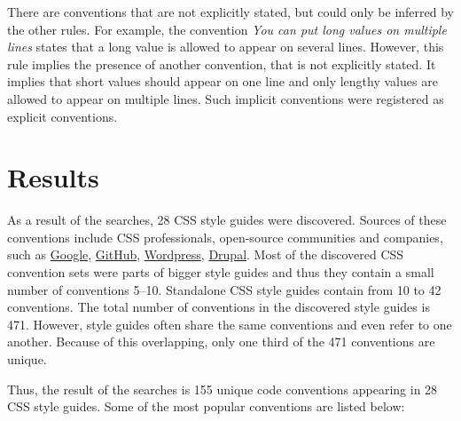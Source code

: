 There are conventions that are not explicitly stated, but could only be
inferred by the other rules. For example, the convention \textit{You can put
long values on multiple lines} states that a long value is allowed to appear
on several lines. However, this rule implies the presence of another
convention, that is not explicitly stated. It implies that short values should
appear on one line and only lengthy values are allowed to appear on multiple lines.
Such implicit conventions were registered as explicit conventions.

\section{Results}

As a result of the searches, 28 CSS style guides were discovered. Sources of
these conventions include CSS professionals, open-source communities and
companies, such as
\href{https://google-styleguide.googlecode.com/svn/trunk/htmlcssguide.xml#Protocol}{Google},
\href{http://primercss.io/guidelines/#css}{GitHub},
\href{https://make.wordpress.org/core/handbook/best-practices/coding-standards/css/}{Wordpress},
\href{https://www.drupal.org/node/1887862}{Drupal}. Most of the discovered CSS
convention sets were parts of bigger style guides and thus they contain a
small number of conventions 5--10. Standalone CSS style guides contain from 10
to 42 conventions. The total number of conventions in the discovered style
guides is 471. However, style guides often share the same conventions and even
refer to one another. Because of this overlapping, only one third of the 471
conventions are unique.

Thus, the result of the searches is 155 unique code conventions appearing in
28 CSS style guides. Some of the most popular conventions are listed below:

